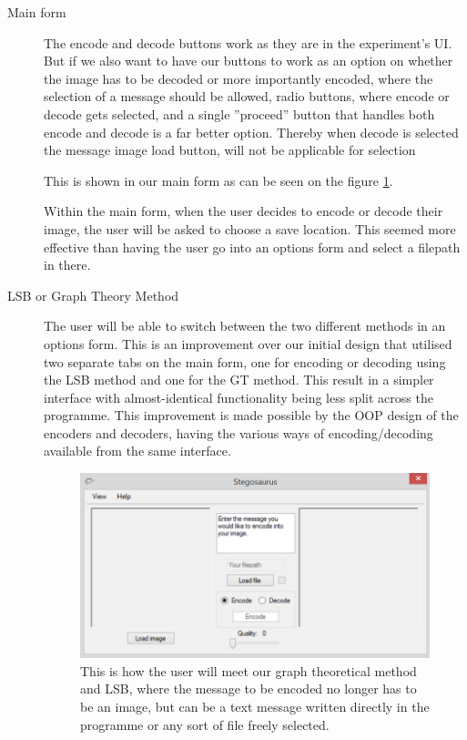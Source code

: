 \begin{description}
\item[Main form]
The encode and decode buttons work as they are in the experiment's UI.
But if we also want to have our buttons to work as an option on whether the image has to be decoded or more importantly encoded, where the selection of a message should be allowed, radio buttons, where encode or decode gets selected, and a single ''proceed'' button that handles both encode and decode is a far better option. Thereby when decode is selected the message image load button, will not be applicable for selection

This is shown in our main form as can be seen on the figure \ref{fig:StegoMainForm}.

Within the main form, when the user decides to encode or decode their image, the user will be asked to choose a save location. This seemed more effective than having the user go into an options form and select a filepath in there.

\item[LSB or Graph Theory Method]
The user will be able to switch between the two different methods in an options form. This is an improvement over our initial design that utilised two separate tabs on the main form, one for encoding or decoding using the LSB method and one for the GT method. This result in a simpler interface with almost-identical functionality being less split across the programme. This improvement is made possible by the OOP design of the encoders and decoders, having the various ways of encoding/decoding available from the same interface.

\begin{figure}
	\centering
	\includegraphics[width=1\textwidth]{figures/StegoMainForm.png}
	\caption{This is how the user will meet our graph theoretical method and LSB, where the message to be encoded no longer has to be an image, but can be a text message written directly in the programme or any sort of file freely selected.}
	\label{fig:StegoMainForm}
\end{figure}


\end{description}

